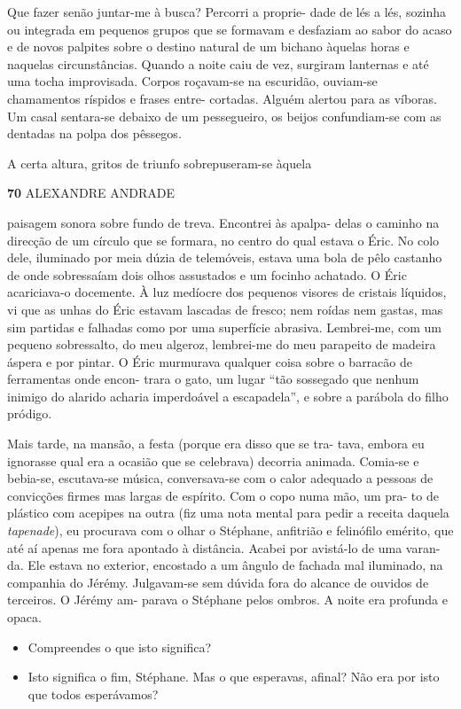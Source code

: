 Que fazer senão juntar-me à busca? Percorri a proprie- dade de lés a
lés, sozinha ou integrada em pequenos grupos que se formavam e desfaziam
ao sabor do acaso e de novos palpites sobre o destino natural de um
bichano àquelas horas e naquelas circunstâncias. Quando a noite caiu de
vez, surgiram lanternas e até uma tocha improvisada. Corpos roçavam-se
na escuridão, ouviam-se chamamentos ríspidos e frases entre- cortadas.
Alguém alertou para as víboras. Um casal sentara-se debaixo de um
pessegueiro, os beijos confundiam-se com as dentadas na polpa dos
pêssegos.

A certa altura, gritos de triunfo sobrepuseram-se àquela

\textbf{70 }ALEXANDRE ANDRADE

paisagem sonora sobre fundo de treva. Encontrei às apalpa- delas o
caminho na direcção de um círculo que se formara, no centro do qual
estava o Éric. No colo dele, iluminado por meia dúzia de telemóveis,
estava uma bola de pêlo castanho de onde sobressaíam dois olhos
assustados e um focinho achatado. O Éric acariciava-o docemente. À luz
medíocre dos pequenos visores de cristais líquidos, vi que as unhas do
Éric estavam lascadas de fresco; nem roídas nem gastas, mas sim partidas
e falhadas como por uma superfície abrasiva. Lembrei-me, com um pequeno
sobressalto, do meu algeroz, lembrei-me do meu parapeito de madeira
áspera e por pintar. O Éric murmurava qualquer coisa sobre o barracão de
ferramentas onde encon- trara o gato, um lugar ``tão sossegado que
nenhum inimigo do alarido acharia imperdoável a escapadela'', e sobre a
parábola do filho pródigo.

Mais tarde, na mansão, a festa (porque era disso que se tra- tava,
embora eu ignorasse qual era a ocasião que se celebrava) decorria
animada. Comia-se e bebia-se, escutava-se música, conversava-se com o
calor adequado a pessoas de convicções firmes mas largas de espírito.
Com o copo numa mão, um pra- to de plástico com acepipes na outra (fiz
uma nota mental para pedir a receita daquela \emph{tapenade}), eu
procurava com o olhar o Stéphane, anfitrião e felinófilo emérito, que
até aí apenas me fora apontado à distância. Acabei por avistá-lo de uma
varan- da. Ele estava no exterior, encostado a um ângulo de fachada mal
iluminado, na companhia do Jérémy. Julgavam-se sem dúvida fora do
alcance de ouvidos de terceiros. O Jérémy am- parava o Stéphane pelos
ombros. A noite era profunda e opaca.

\begin{itemize}
\tightlist
\item
  Compreendes o que isto significa?
\item
  Isto significa o fim, Stéphane. Mas o que esperavas, afinal? Não era
  por isto que todos esperávamos?
\end{itemize}

